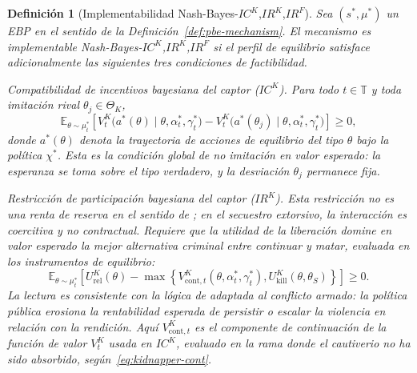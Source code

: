 \documentclass[pdflatex,sn-mathphys-ay]{sn-jnl}
\providecommand{\textcite}{\citet}
\theoremstyle{thmstyleone}
\theoremstyle{thmstyletwo}
\theoremstyle{thmstylethree}
\newtheorem{definition}{Definición}
\newcommand{\ThetaK}{\Theta_K}
\newcommand{\1}{\mathbf{1}}
\begin{document}
\begin{definition}[Implementabilidad Nash-Bayes-$IC^K$,$IR^K$,$IR^F$]
\label{def:implementable-mechanism}
Sea $(s^\ast,\mu^\ast)$ un EBP en el sentido de la Definición~\ref{def:pbe-mechanism}. El mecanismo es implementable Nash-Bayes-$IC^K$,$IR^K$,$IR^F$ si el perfil de equilibrio satisface adicionalmente las siguientes tres condiciones de factibilidad.

\smallskip
\noindent Compatibilidad de incentivos bayesiana del captor \textup{(}$IC^K$\textup{)}. Para todo $t\in\mathbb{T}$ y toda imitación rival $\theta_j\in\ThetaK$,
\[
\mathbb{E}_{\theta\sim\mu_t^\ast}
\left[
V^K_t\!\bigl(a^\ast(\theta)\mid \theta,\alpha_t^\ast,\gamma_t^\ast\bigr)
-
V^K_t\!\bigl(a^\ast(\theta_j)\mid \theta,\alpha_t^\ast,\gamma_t^\ast\bigr)
\right]
\ge 0,
\]
donde $a^\ast(\theta)$ denota la trayectoria de acciones de equilibrio del tipo $\theta$ bajo la política $\chi^\ast$. Esta es la condición global de no imitación en valor esperado: la esperanza se toma sobre el tipo verdadero, y la desviación $\theta_j$ permanece fija.

\smallskip
\noindent Restricción de participación bayesiana del captor \textup{(}$IR^K$\textup{)}. Esta restricción no es una renta de reserva en el sentido de \textcite{Myerson1979IC}; en el secuestro extorsivo, la interacción es coercitiva y no contractual. Requiere que la utilidad de la liberación domine en valor esperado la mejor alternativa criminal entre continuar y matar, evaluada en los instrumentos de equilibrio:
\[
\mathbb{E}_{\theta\sim\mu_t^\ast}
\left[
U^K_{\mathrm{rel}}(\theta)
-
\max\left\{
V^K_{\mathrm{cont},t}(\theta,\alpha_t^\ast,\gamma_t^\ast),
U^K_{\mathrm{kill}}(\theta,\theta_S)
\right\}
\right]
\ge0.
\]
La lectura es consistente con la lógica de \textcite{Becker1968} adaptada al conflicto armado: la política pública erosiona la rentabilidad esperada de persistir o escalar la violencia en relación con la rendición. Aquí $V^K_{\mathrm{cont},t}$ es el componente de continuación de la función de valor $V^K_t$ usada en $IC^K$, evaluado en la rama donde el cautiverio no ha sido absorbido, según~\eqref{eq:kidnapper-cont}.


\end{definition}
\end{document}
